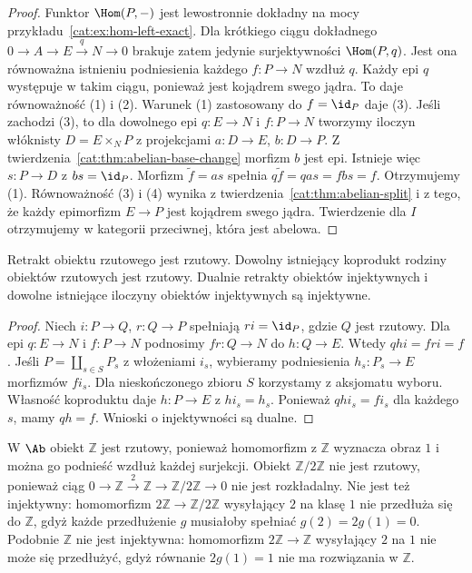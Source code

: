 \begin{proof}
Funktor $\Hom(P,-)$ jest lewostronnie dokładny na mocy przykładu~\ref{cat:ex:hom-left-exact}. Dla krótkiego ciągu dokładnego $0\to A\to E\xrightarrow{q}N\to0$ brakuje zatem jedynie surjektywności $\Hom(P,q)$. Jest ona równoważna istnieniu podniesienia każdego $f:P\to N$ wzdłuż $q$. Każdy epi $q$ występuje w takim ciągu, ponieważ jest kojądrem swego jądra. To daje równoważność (1) i (2).
Warunek (1) zastosowany do $f=\id_P$ daje (3). Jeśli zachodzi (3), to dla dowolnego epi $q:E\to N$ i $f:P\to N$ tworzymy iloczyn włóknisty $D=E\times_N P$ z projekcjami $a:D\to E$, $b:D\to P$. Z twierdzenia~\ref{cat:thm:abelian-base-change} morfizm $b$ jest epi. Istnieje więc $s:P\to D$ z $bs=\id_P$. Morfizm $\widetilde f=as$ spełnia $q\widetilde f=qas=fbs=f$. Otrzymujemy (1). Równoważność (3) i (4) wynika z twierdzenia~\ref{cat:thm:abelian-split} i z tego, że każdy epimorfizm $E\to P$ jest kojądrem swego jądra. Twierdzenie dla $I$ otrzymujemy w kategorii przeciwnej, która jest abelowa.
\end{proof}
\begin{stwierdzenie}\label{cat:prop:projective-retracts}
Retrakt obiektu rzutowego jest rzutowy. Dowolny istniejący koprodukt rodziny obiektów rzutowych jest rzutowy. Dualnie retrakty obiektów injektywnych i dowolne istniejące iloczyny obiektów injektywnych są injektywne.
\end{stwierdzenie}
\begin{proof}
Niech $i:P\to Q$, $r:Q\to P$ spełniają $ri=\id_P$, gdzie $Q$ jest rzutowy. Dla epi $q:E\to N$ i $f:P\to N$ podnosimy $fr:Q\to N$ do $h:Q\to E$. Wtedy $qhi=fri=f$. Jeśli $P=\coprod_{s\in S}P_s$ z włożeniami $i_s$, wybieramy podniesienia $h_s:P_s\to E$ morfizmów $fi_s$. Dla nieskończonego zbioru $S$ korzystamy z aksjomatu wyboru. Własność koproduktu daje $h:P\to E$ z $hi_s=h_s$. Ponieważ $qhi_s=fi_s$ dla każdego $s$, mamy $qh=f$. Wnioski o injektywności są dualne.
\end{proof}
\begin{przyklad}
W $\Ab$ obiekt $\mathbb Z$ jest rzutowy, ponieważ homomorfizm z $\mathbb Z$ wyznacza obraz $1$ i można go podnieść wzdłuż każdej surjekcji. Obiekt $\mathbb Z/2\mathbb Z$ nie jest rzutowy, ponieważ ciąg $0\to\mathbb Z\xrightarrow{2}\mathbb Z\to\mathbb Z/2\mathbb Z\to0$ nie jest rozkładalny. Nie jest też injektywny: homomorfizm $2\mathbb Z\to\mathbb Z/2\mathbb Z$ wysyłający $2$ na klasę $1$ nie przedłuża się do $\mathbb Z$, gdyż każde przedłużenie $g$ musiałoby spełniać $g(2)=2g(1)=0$. Podobnie $\mathbb Z$ nie jest injektywna: homomorfizm $2\mathbb Z\to\mathbb Z$ wysyłający $2$ na $1$ nie może się przedłużyć, gdyż równanie $2g(1)=1$ nie ma rozwiązania w $\mathbb Z$.
\end{przyklad}

